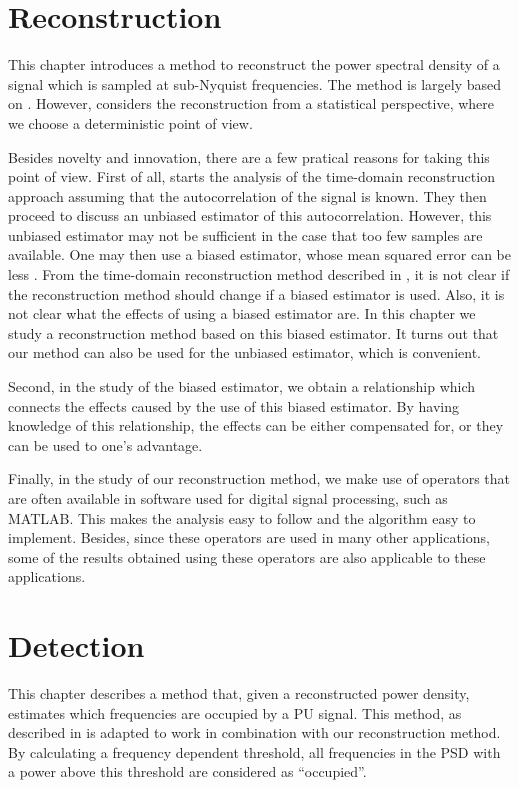 \documentclass[a4paper, openany, oneside]{memoir}
\begin{document}
\chapter{Reconstruction}
This chapter introduces a method to reconstruct the power spectral density of a signal which is sampled at sub-Nyquist frequencies. The method is largely based on \cite{ariananda2012compressive}. However, \cite{ariananda2012compressive} considers the reconstruction from a statistical perspective, where we choose a deterministic point of view.

Besides novelty and innovation, there are a few pratical reasons for taking this point of view. First of all, \cite{ariananda2012compressive} starts the analysis of the time-domain reconstruction approach assuming that the autocorrelation of the signal is known. They then proceed to discuss an unbiased estimator of this autocorrelation. However, this unbiased estimator may not be sufficient in the case that too few samples are available. One may then use a biased estimator, whose mean squared error can be less \cite{percival1993univariate}. From the time-domain reconstruction method described in \cite{ariananda2012compressive}, it is not clear if the reconstruction method should change if a biased estimator is used. Also, it is not clear what the effects of using a biased estimator are. In this chapter we study a reconstruction method based on this biased estimator. It turns out that our method can also be used for the unbiased estimator, which is convenient.

Second, in the study of the biased estimator, we obtain a relationship which connects the effects caused by the use of this biased estimator. By having knowledge of this relationship, the effects can be either compensated for, or they can be used to one's advantage.

Finally, in the study of our reconstruction method, we make use of operators that are often available in software used for digital signal processing, such as MATLAB. This makes the analysis easy to follow and the algorithm easy to implement. Besides, since these operators are used in many other applications, some of the results obtained using these operators are also applicable to these applications.


\chapter{Detection}
This chapter describes a method that, given a reconstructed power density, estimates which frequencies are occupied by a PU signal. This method, as described in \cite{ariananda2012compressive} is adapted to work in combination with our reconstruction method. By calculating a frequency dependent threshold, all frequencies in the PSD with a power above this threshold are considered as ``occupied''. 
\end{document}
